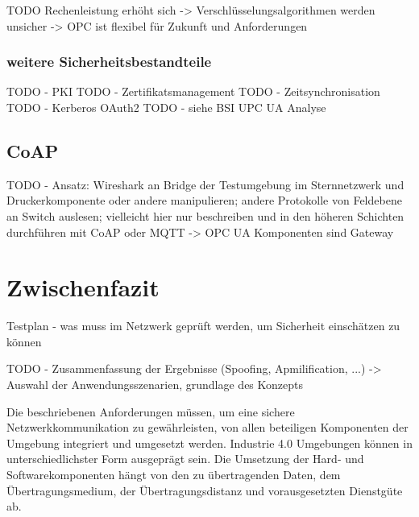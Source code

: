 \clearpage

TODO Rechenleistung erhöht sich -> Verschlüsselungsalgorithmen werden unsicher -> OPC ist flexibel für Zukunft und Anforderungen

\subsubsection{weitere Sicherheitsbestandteile}
TODO - PKI 
TODO - Zertifikatsmanagement 
TODO - Zeitsynchronisation
TODO - Kerberos OAuth2
TODO - siehe BSI UPC UA Analyse

\subsection{\ac{CoAP}}
TODO - Ansatz: Wireshark an Bridge der Testumgebung im Sternnetzwerk und Druckerkomponente oder andere manipulieren; andere Protokolle von Feldebene an Switch auslesen; vielleicht hier nur beschreiben und in den höheren Schichten durchführen mit CoAP oder MQTT -> OPC UA Komponenten sind Gateway

\section{Zwischenfazit}
Testplan - was muss im Netzwerk geprüft werden, um Sicherheit einschätzen zu können

TODO - Zusammenfassung der Ergebnisse (Spoofing, Apmilification, ...)
-> Auswahl der Anwendungsszenarien, grundlage des Konzepts

Die beschriebenen Anforderungen müssen, um eine sichere Netzwerkkommunikation zu gewährleisten, von allen beteiligen Komponenten der Umgebung integriert und umgesetzt werden. Industrie 4.0 Umgebungen können in unterschiedlichster Form ausgeprägt sein. Die Umsetzung der Hard- und Softwarekomponenten hängt von den zu übertragenden Daten, dem Übertragungsmedium, der Übertragungsdistanz und vorausgesetzten Dienstgüte ab.